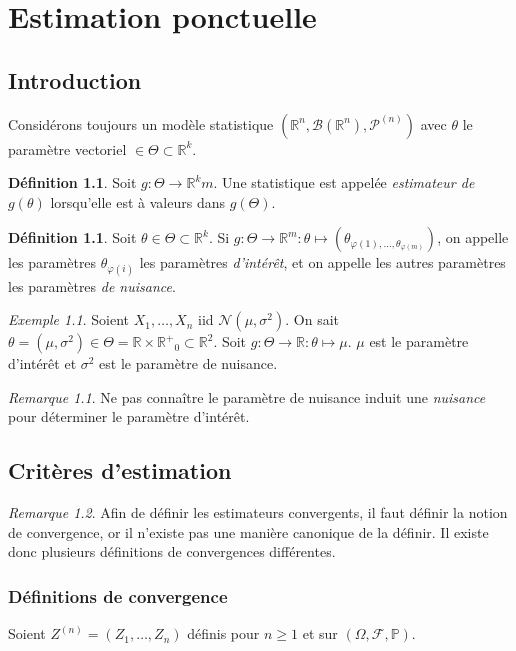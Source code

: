 \documentclass{report}
\renewcommand{\P}{\mathbb P}
\newcommand{\statmod}[4]{\left(#1^{#4}, #2\left(#1^{#4}\right), #3^{\left(#4\right)}\right)}
\newcommand{\probspace}[3]{\left(#1, #2, #3\right)}
\newcommand{\Nms}{\mathcal N(\mu, \sigma^2)}
\newcommand{\R}{\mathbb R}
\newcommand{\Rp}{{\mathbb R^+}}
\newcommand{\Brl}{\mathcal B}  %
\theoremstyle{definition}
\newtheorem{déf}[thm]{Définition}
\theoremstyle{remark}
\newtheorem*{rmq}{Remarque}
\newtheorem{ex}{Exemple}[chapter]
\begin{document}
\chapter{Estimation ponctuelle}
	\section{Introduction}
		Considérons toujours un modèle statistique $\statmod \R\Brl{\mathcal P}n$ avec $\theta$ le paramètre vectoriel $\in \Theta \subset \R^k$.

		\begin{déf} Soit $g : \Theta \to \R^km$. Une statistique est appelée \textit{estimateur de $g(\theta)$} lorsqu'elle est à valeurs dans $g(\Theta)$.
		\end{déf}

		\begin{déf} Soit $\theta \in \Theta \subset \R^k$. Si $g : \Theta \to \R^m : \theta \mapsto (\theta_{\varphi(1), \ldots, \theta_{\varphi(m)}})$, on
		appelle les paramètres $\theta_{\varphi(i)}$ les paramètres \textit{d'intérêt}, et on appelle les autres paramètres les paramètres \textit{de nuisance}.
		\end{déf}

		\begin{ex} Soient $X_1, \ldots, X_n$ iid $\Nms$. On sait $\theta = (\mu, \sigma^2) \in \Theta = \R \times \Rp_0 \subset \R^2$.
		Soit $g : \Theta \to \R : \theta \mapsto \mu$. $\mu$ est le paramètre d'intérêt et $\sigma^2$ est le paramètre de nuisance.
		\end{ex}

		\begin{rmq} Ne pas connaître le paramètre de nuisance induit une \textit{nuisance} pour déterminer le paramètre d'intérêt.
		\end{rmq}

	\section{Critères d'estimation}
		\begin{rmq} Afin de définir les estimateurs convergents, il faut définir la notion de convergence, or il n'existe pas une manière canonique de la définir.
		Il existe donc plusieurs définitions de convergences différentes.
		\end{rmq}

		\subsection{Définitions de convergence}
			Soient $Z^{(n)} = (Z_1, \ldots, Z_n)$ définis pour $n \geq 1$ et sur $\probspace \Omega{\mathcal F}\P$.
\end{document}
